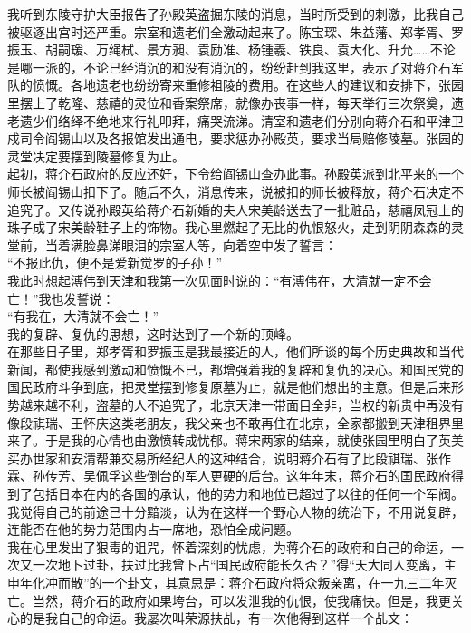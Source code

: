 我听到东陵守护大臣报告了孙殿英盗掘东陵的消息，当时所受到的刺激，比我自己被驱逐出宫时还严重。宗室和遗老们全激动起来了。陈宝琛、朱益藩、郑孝胥、罗振玉、胡嗣瑗、万绳栻、景方昶、袁励准、杨锺羲、铁良、袁大化、升允……不论是哪一派的，不论已经消沉的和没有消沉的，纷纷赶到我这里，表示了对蒋介石军队的愤慨。各地遗老也纷纷寄来重修祖陵的费用。在这些人的建议和安排下，张园里摆上了乾隆、慈禧的灵位和香案祭席，就像办丧事一样，每天举行三次祭奠，遗老遗少们络绎不绝地来行礼叩拜，痛哭流涕。清室和遗老们分别向蒋介石和平津卫戍司令阎锡山以及各报馆发出通电，要求惩办孙殿英，要求当局赔修陵墓。张园的灵堂决定要摆到陵墓修复为止。\\

起初，蒋介石政府的反应还好，下令给阎锡山查办此事。孙殿英派到北平来的一个师长被阎锡山扣下了。随后不久，消息传来，说被扣的师长被释放，蒋介石决定不追究了。又传说孙殿英给蒋介石新婚的夫人宋美龄送去了一批赃品，慈禧凤冠上的珠子成了宋美龄鞋子上的饰物。我心里燃起了无比的仇恨怒火，走到阴阴森森的灵堂前，当着满脸鼻涕眼泪的宗室人等，向着空中发了誓言：\\

“不报此仇，便不是爱新觉罗的子孙！”\\

我此时想起溥伟到天津和我第一次见面时说的：“有溥伟在，大清就一定不会亡！”我也发誓说：\\

“有我在，大清就不会亡！”\\

我的复辟、复仇的思想，这时达到了一个新的顶峰。\\

在那些日子里，郑孝胥和罗振玉是我最接近的人，他们所谈的每个历史典故和当代新闻，都使我感到激动和愤慨不已，都增强着我的复辟和复仇的决心。和国民党的国民政府斗争到底，把灵堂摆到修复原墓为止，就是他们想出的主意。但是后来形势越来越不利，盗墓的人不追究了，北京天津一带面目全非，当权的新贵中再没有像段祺瑞、王怀庆这类老朋友，我父亲也不敢再住在北京，全家都搬到天津租界里来了。于是我的心情也由激愤转成忧郁。蒋宋两家的结亲，就使张园里明白了英美买办世家和安清帮兼交易所经纪人的这种结合，说明蒋介石有了比段祺瑞、张作霖、孙传芳、吴佩孚这些倒台的军人更硬的后台。这年年末，蒋介石的国民政府得到了包括日本在内的各国的承认，他的势力和地位已超过了以往的任何一个军阀。我觉得自己的前途已十分黯淡，认为在这样一个野心人物的统治下，不用说复辟，连能否在他的势力范围内占一席地，恐怕全成问题。\\

我在心里发出了狠毒的诅咒，怀着深刻的忧虑，为蒋介石的政府和自己的命运，一次又一次地卜过卦，扶过比我曾卜占“国民政府能长久否？”得“天大同人变离，主申年化冲而散”的一个卦文，其意思是：蒋介石政府将众叛亲离，在一九三二年灭亡。当然，蒋介石的政府如果垮台，可以发泄我的仇恨，使我痛快。但是，我更关心的是我自己的命运。我屡次叫荣源扶乩，有一次他得到这样一个乩文：\\


